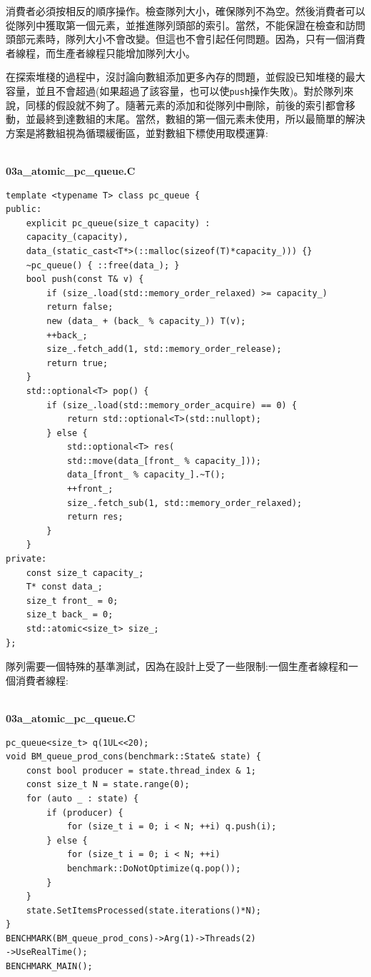 消費者必須按相反的順序操作。檢查隊列大小，確保隊列不為空。然後消費者可以從隊列中獲取第一個元素，並推進隊列頭部的索引。當然，不能保證在檢查和訪問頭部元素時，隊列大小不會改變。但這也不會引起任何問題。因為，只有一個消費者線程，而生產者線程只能增加隊列大小。

在探索堆棧的過程中，沒討論向數組添加更多內存的問題，並假設已知堆棧的最大容量，並且不會超過(如果超過了該容量，也可以使\texttt{push}操作失敗)。對於隊列來說，同樣的假設就不夠了。隨著元素的添加和從隊列中刪除，前後的索引都會移動，並最終到達數組的末尾。當然，數組的第一個元素未使用，所以最簡單的解決方案是將數組視為循環緩衝區，並對數組下標使用取模運算:

\hspace*{\fill} \\ %
\noindent
\textbf{03a\_atomic\_pc\_queue.C}
\begin{lstlisting}[style=styleCXX]
template <typename T> class pc_queue {
public:
	explicit pc_queue(size_t capacity) : 
	capacity_(capacity),
	data_(static_cast<T*>(::malloc(sizeof(T)*capacity_))) {}
	~pc_queue() { ::free(data_); }
	bool push(const T& v) {
		if (size_.load(std::memory_order_relaxed) >= capacity_)
		return false;
		new (data_ + (back_ % capacity_)) T(v);
		++back_;
		size_.fetch_add(1, std::memory_order_release);
		return true;
	}
	std::optional<T> pop() {
		if (size_.load(std::memory_order_acquire) == 0) {
			return std::optional<T>(std::nullopt);
		} else {
			std::optional<T> res(
			std::move(data_[front_ % capacity_]));
			data_[front_ % capacity_].~T();
			++front_;
			size_.fetch_sub(1, std::memory_order_relaxed);
			return res;
		}
	}
private:
	const size_t capacity_;
	T* const data_;
	size_t front_ = 0;
	size_t back_ = 0;
	std::atomic<size_t> size_;
};
\end{lstlisting}

隊列需要一個特殊的基準測試，因為在設計上受了一些限制:一個生產者線程和一個消費者線程:

\hspace*{\fill} \\ %
\noindent
\textbf{03a\_atomic\_pc\_queue.C}
\begin{lstlisting}[style=styleCXX]
pc_queue<size_t> q(1UL<<20);
void BM_queue_prod_cons(benchmark::State& state) {
	const bool producer = state.thread_index & 1;
	const size_t N = state.range(0);
	for (auto _ : state) {
		if (producer) {
			for (size_t i = 0; i < N; ++i) q.push(i);
		} else {
			for (size_t i = 0; i < N; ++i) 
			benchmark::DoNotOptimize(q.pop());
		}
	}
	state.SetItemsProcessed(state.iterations()*N);
}
BENCHMARK(BM_queue_prod_cons)->Arg(1)->Threads(2)
->UseRealTime();
BENCHMARK_MAIN();
\end{lstlisting}

